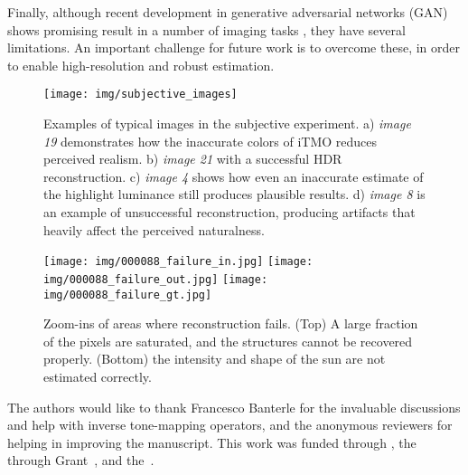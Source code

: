 \documentclass[acmtog]{acmart}
\newcommand\belowfigspace{-2pt}
\begin{document}
Finally, although recent development in generative adversarial networks (GAN) \cite{Goodfellow2014,Radford2015} shows promising result in a number of imaging tasks \cite{Pathak2016,Ledig2016}, they have several limitations. An important challenge for future work is to overcome these, in order to enable high-resolution and robust estimation.

\begin{figure}
	\newcommand\ww{0.48}
	\centering
	\texttt{[image: img/subjective\_images]}
	\caption{\label{fig:eval_images} Examples of typical images in the subjective experiment. a) \emph{image 19} demonstrates how the inaccurate colors of iTMO reduces perceived realism. b) \emph{image 21} with a successful HDR reconstruction. c) \emph{image 4} shows how even an inaccurate estimate of the highlight luminance still produces plausible results. d) \emph{image 8} is an example of unsuccessful reconstruction, producing artifacts that heavily affect the perceived naturalness. }
	\vspace{\belowfigspace}
\end{figure}

\begin{figure}[t]
	\newcommand\ww{0.155}
	\centering
	\texttt{[image: img/000088\_failure\_in.jpg]}
	\texttt{[image: img/000088\_failure\_out.jpg]}
	\texttt{[image: img/000088\_failure\_gt.jpg]}\\
	\vspace{-2pt}
	\vspace{-10pt}
	\caption{\label{fig:failure} Zoom-ins of areas where reconstruction fails. (Top) A large fraction of the pixels are saturated, and the structures cannot be recovered properly. (Bottom) the intensity and shape of the sun are not estimated correctly.}
	\vspace{\belowfigspace}
\end{figure}

\begin{acks}
The authors would like to thank Francesco Banterle for the invaluable discussions and help with inverse tone-mapping operators, and the anonymous reviewers for helping in improving the manuscript. This work was funded through , the~ through Grant~, and the~.
\end{acks}
\end{document}

